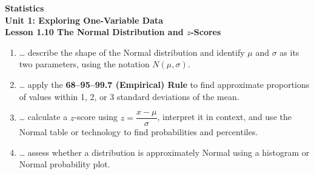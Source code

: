 \documentclass[10pt]{article}
\begin{document}
\vspace{-0.8in}

\begin{center}
  {\color{white}\textbf{\LARGE Statistics}}\\[4pt]
  {\color{skymid}\large\textbf{Unit 1: Exploring One-Variable Data}}\\[6pt]
  {\color{white}\textbf{\large Lesson 1.10 \quad The Normal Distribution and $z$-Scores}}
\end{center}

\vspace{0.22in}

\namedateperiod

\vspace{0.18in}

\begin{learningtargetbox}
\small
\begin{enumerate}[leftmargin=1.5em, itemsep=5pt]
  \item \ldots{} describe the shape of the Normal distribution and identify
        $\mu$ and $\sigma$ as its two parameters, using the notation $N(\mu, \sigma)$.
  \item \ldots{} apply the \textbf{68--95--99.7 (Empirical) Rule} to find approximate
        proportions of values within 1, 2, or 3 standard deviations of the mean.
  \item \ldots{} calculate a $z$-score using $z = \dfrac{x - \mu}{\sigma}$, interpret
        it in context, and use the Normal table or technology to find probabilities
        and percentiles.
  \item \ldots{} assess whether a distribution is approximately Normal using a
        histogram or Normal probability plot.
\end{enumerate}
\end{learningtargetbox}

\vspace{0.14in}
\end{document}
